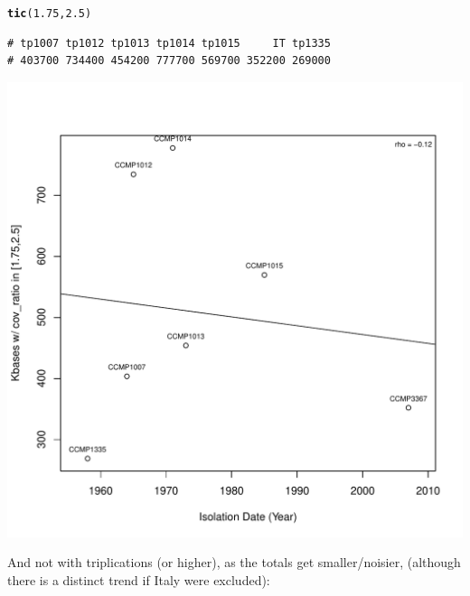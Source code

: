\documentclass{article}\usepackage[]{graphicx}\usepackage[]{color}
\makeatletter
\def\maxwidth{ %
  \ifdim\Gin@nat@width>\linewidth
    \linewidth
  \else
    \Gin@nat@width
  \fi
}
\newcommand{\hlnum}[1]{\textcolor[rgb]{0.686,0.059,0.569}{#1}}%
\newcommand{\hlstd}[1]{\textcolor[rgb]{0.345,0.345,0.345}{#1}}%
\newcommand{\hlkwd}[1]{\textcolor[rgb]{0.737,0.353,0.396}{\textbf{#1}}}%
\newenvironment{kframe}{%
 \def\at@end@of@kframe{}%
 \ifinner\ifhmode%
  \def\at@end@of@kframe{\end{minipage}}%
  \begin{minipage}{\columnwidth}%
 \fi\fi%
 \def\FrameCommand##1{\hskip\@totalleftmargin \hskip-\fboxsep
 \colorbox{shadecolor}{##1}\hskip-\fboxsep
     \hskip-\linewidth \hskip-\@totalleftmargin \hskip\columnwidth}%
 \MakeFramed {\advance\hsize-\width
   \@totalleftmargin\z@ \linewidth\hsize
   \@setminipage}}%
 {\par\unskip\endMakeFramed%
 \at@end@of@kframe}
\newenvironment{knitrout}{}{} %
\makeatother
\begin{document}
\begin{knitrout}\footnotesize
{}\color{fgcolor}\begin{kframe}
\begin{alltt}
\hlkwd{tic}\hlstd{(}\hlnum{1.75}\hlstd{,}\hlnum{2.5}\hlstd{)}
\end{alltt}
\begin{verbatim}
# tp1007 tp1012 tp1013 tp1014 tp1015     IT tp1335 
# 403700 734400 454200 777700 569700 352200 269000
\end{verbatim}
\end{kframe}

{\centering \includegraphics[width=\maxwidth]{figs-knitr/duplication-1} 

}



\end{knitrout}

And not with triplications (or higher), as the totals get smaller/noisier, (although there is a distinct trend if Italy were excluded):
\end{document}
